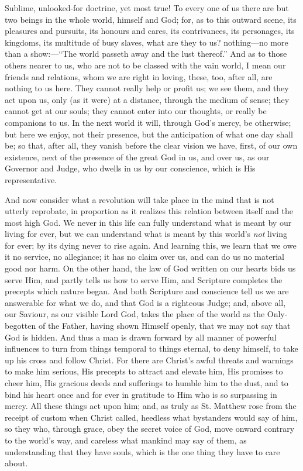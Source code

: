 Sublime, unlooked-for doctrine, yet most true! To
every one of us there are but two beings in the whole
world, himself and God; for, as to this outward scene,
its pleasures and pursuits, its honours and cares, its
contrivances, its personages, its kingdoms, its multitude
of busy slaves, what are they to us? nothing—no more
than a show:—``The world passeth away and the
lust thereof.'' And as to those others nearer to us,
who are not to be classed with the vain world, I mean our
friends and relations, whom we are right in loving,
these, too, after all, are nothing to us here. They
cannot really help or profit us; we see them, and they
act upon us, only (as it were) at a distance, through the
medium of sense; they cannot get at our souls; they
cannot enter into our thoughts, or really be companions
to us. In the next world it will, through God's mercy, be
otherwise; but here we enjoy, not their presence, but the
anticipation of what one day shall be; so that, after
all, they vanish before the clear vision we have, first,
of our own existence, next of the presence of the great
God in us, and over us, as our Governor and Judge, who
dwells in us by our conscience, which is His
representative.

And now consider what a revolution will take place in
the mind that is not utterly reprobate, in proportion as
it realizes this relation between itself and the most high God. We never in this life can fully understand what
is meant by our living for ever, but we can understand
what is meant by this world's \emph{not} living for ever; by its
dying never to rise again. And learning this, we learn
that we owe it no service, no allegiance; it has no claim
over us, and can do us no material good nor harm. On the
other hand, the law of God written on our hearts bids us
serve Him, and partly tells us how to serve Him, and
Scripture completes the precepts which nature began. And
both Scripture and conscience tell us we are answerable
for what we do, and that God is a righteous Judge; and,
above all, our Saviour, as our visible Lord God, takes
the place of the world as the Only-begotten of the
Father, having shown Himself openly, that we may not say
that God is hidden. And thus a man is drawn forward by
all manner of powerful influences to turn from things
temporal to things eternal, to deny himself, to take up
his cross and follow Christ. For there are Christ's awful
threats and warnings to make him serious, His precepts to
attract and elevate him, His promises to cheer him, His
gracious deeds and sufferings to humble him to the dust,
and to bind his heart once and for ever in gratitude to
Him who is so surpassing in mercy. All these things act
upon him; and, as truly as St. Matthew rose from the
receipt of custom when Christ called, heedless what
bystanders would say of him, so they who, through grace,
obey the secret voice of God, move onward contrary to the
world's way, and careless what mankind may say of them,
as understanding that they have souls, which is the one
thing they have to care about.

